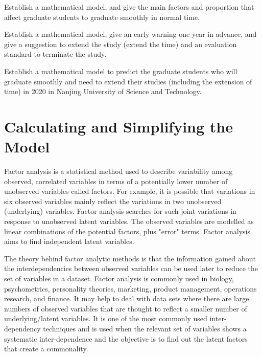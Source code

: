 \documentclass{mcmthesis}
\begin{document}
\begin{Exercise}

	Establish a mathematical model, and give the main factors and
	proportion that affect graduate students to graduate smoothly in
	normal time.

\end{Exercise}

\begin{Exercise}

	Establish a mathematical model, give an early warning one year in
	advance, and give a suggestion to extend the study (extend the
	time) and an evaluation standard to terminate the study.

\end{Exercise}

\begin{Exercise}

	Establish a mathematical model to predict the graduate students
	who will graduate smoothly and need to extend their studies
	(including the extension of time) in 2020 in Nanjing University
	of Science and Technology.

\end{Exercise}

\section{Calculating and Simplifying the Model}%
\label{sec:Calculating and Simplifying the Model}

Factor analysis is a statistical method used to describe variability among
observed, correlated variables in terms of a potentially lower number of
unobserved variables called factors. For example, it is possible that variations
in six observed variables mainly reflect the variations in two unobserved
(underlying) variables. Factor analysis searches for such joint variations in
response to unobserved latent variables. The observed variables are modelled as
linear combinations of the potential factors, plus "error" terms. Factor
analysis aims to find independent latent variables.

The theory behind factor analytic methods is that the information gained about
the interdependencies between observed variables can be used later to reduce the
set of variables in a dataset. Factor analysis is commonly used in biology,
psychometrics, personality theories, marketing, product management, operations
research, and finance. It may help to deal with data sets where there are large
numbers of observed variables that are thought to reflect a smaller number of
underlying/latent variables. It is one of the most commonly used
inter-dependency techniques and is used when the relevant set of variables shows
a systematic inter-dependence and the objective is to find out the latent
factors that create a commonality.
\end{document}
